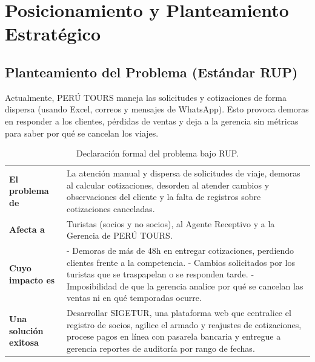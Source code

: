\section{Posicionamiento y Planteamiento Estratégico}

\subsection{Planteamiento del Problema (Estándar RUP)}
Actualmente, PERÚ TOURS maneja las solicitudes y cotizaciones de forma dispersa (usando Excel, correos y mensajes de WhatsApp). Esto provoca demoras en responder a los clientes, pérdidas de ventas y deja a la gerencia sin métricas para saber por qué se cancelan los viajes.

\begin{table}[H]
\centering
\footnotesize
\begin{tabularx}{\textwidth}{lX}
\toprule

\textbf{El problema de} & La atención manual y dispersa de solicitudes de viaje, demoras al calcular cotizaciones, desorden al atender cambios y observaciones del cliente y la falta de registros sobre cotizaciones
canceladas. \\ 
\textbf{Afecta a} & Turistas (socios y no socios), al Agente Receptivo y a la Gerencia de PERÚ TOURS. \\ 
\textbf{Cuyo impacto es} & 
- Demoras de más de 48h en entregar cotizaciones, perdiendo clientes frente a la competencia.\newline
- Cambios solicitados por los turistas que se traspapelan o se responden tarde.\newline
- Imposibilidad de que la gerencia analice por qué se cancelan las ventas ni en qué temporadas ocurre. \\ 
\textbf{Una solución exitosa} & Desarrollar SIGETUR, una plataforma web que centralice el registro de socios, agilice el armado y reajustes de cotizaciones, procese pagos en línea con pasarela bancaria y entregue a gerencia reportes de auditoría por rango de fechas. \\ 
\bottomrule
\end{tabularx}
\caption{Declaración formal del problema bajo RUP.}\label{tab:problema}
\end{table}

